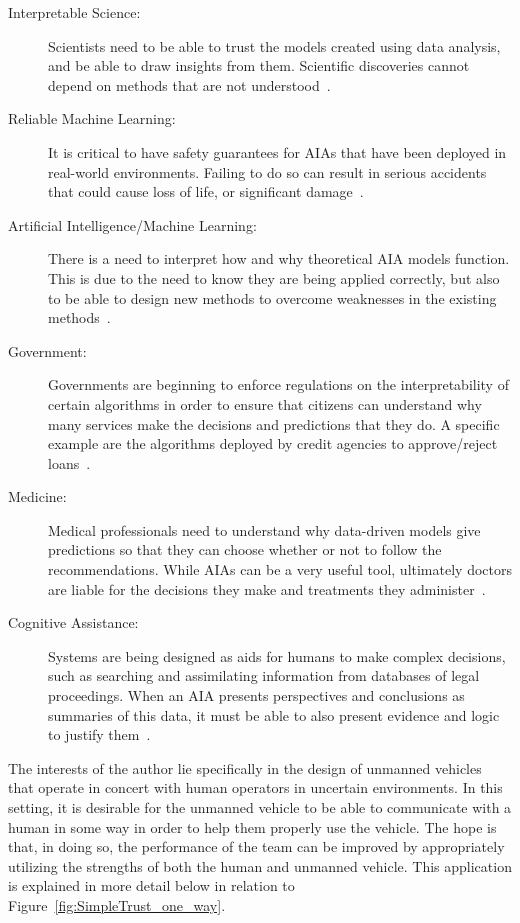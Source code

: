     \begin{description}
        \item [Interpretable Science:] Scientists need to be able to trust the models created using data analysis, and be able to draw insights from them. Scientific discoveries cannot depend on methods that are not understood~\cite{Kumar2016-yw}.
        \item [Reliable Machine Learning:] It is critical to have safety guarantees for AIAs that have been deployed in real-world environments. Failing to do so can result in serious accidents that could cause loss of life, or significant damage~\cite{Sugiyama2013-ci,Amodei2016-xi}.
        \item [Artificial Intelligence/Machine Learning:] There is a need to interpret how and why theoretical AIA models function. This is due to the need to know they are being applied correctly, but also to be able to design new methods to overcome weaknesses in the existing methods~\cite{Garcia2015-rs,Otte2013-oo}.
        \item [Government:] Governments are beginning to enforce regulations on the interpretability of certain algorithms in order to ensure that citizens can understand why many services make the decisions and predictions that they do. A specific example are the algorithms deployed by credit agencies to approve/reject loans~\cite{Wagner2016-ck,Turner2016-jq}.
        \item [Medicine:] Medical professionals need to understand why data-driven models give predictions so that they can choose whether or not to follow the recommendations. While AIAs can be a very useful tool, ultimately doctors are liable for the decisions they make and treatments they administer~\cite{Caruana2015-za,Jovanovic2016-gw}.
        \item [Cognitive Assistance:] Systems are being designed as aids for humans to make complex decisions, such as searching and assimilating information from databases of legal proceedings. When an AIA presents perspectives and conclusions as summaries of this data, it must be able to also present evidence and logic to justify them~\cite{Joshi2016-og,Gutfreund2016-xe}.
    \end{description}

    The interests of the author lie specifically in the design of unmanned vehicles that operate in concert with human operators in uncertain environments. In this setting, it is desirable for the unmanned vehicle to be able to communicate with a human in some way in order to help them properly use the vehicle. The hope is that, in doing so, the performance of the team can be improved by appropriately utilizing the strengths of both the human and unmanned vehicle. This application is explained in more detail below in relation to Figure~\ref{fig:SimpleTrust_one_way}.

